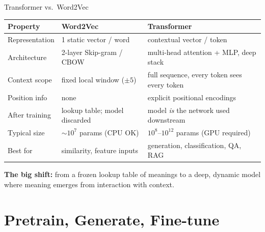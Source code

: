 \documentclass[10pt,english,aspectratio=169]{beamer}
\begin{document}
\begin{frame}{Transformer vs.\ Word2Vec}
\begin{center}
\renewcommand{\arraystretch}{1.3}
\begin{tabular}{l l l}
\toprule
\textbf{Property} & \textbf{Word2Vec} & \textbf{Transformer} \\
\midrule
Representation & 1 static vector / word & contextual vector / token \\
Architecture & 2-layer Skip-gram / CBOW & multi-head attention + MLP, deep stack \\
Context scope & fixed local window ($\pm5$) & full sequence, every token sees every token \\
Position info & none & explicit positional encodings \\
After training & lookup table; model discarded & model \emph{is} the network used downstream \\
Typical size & $\sim10^{7}$ params (CPU OK) & $10^{8}$--$10^{12}$ params (GPU required) \\
Best for & similarity, feature inputs & generation, classification, QA, RAG \\
\bottomrule
\end{tabular}
\end{center}

\medskip
\textbf{The big shift:} from a frozen lookup table of meanings to a deep, dynamic model where meaning emerges from interaction with context.
\end{frame}

\section{Pretrain, Generate, Fine-tune}
\end{document}
